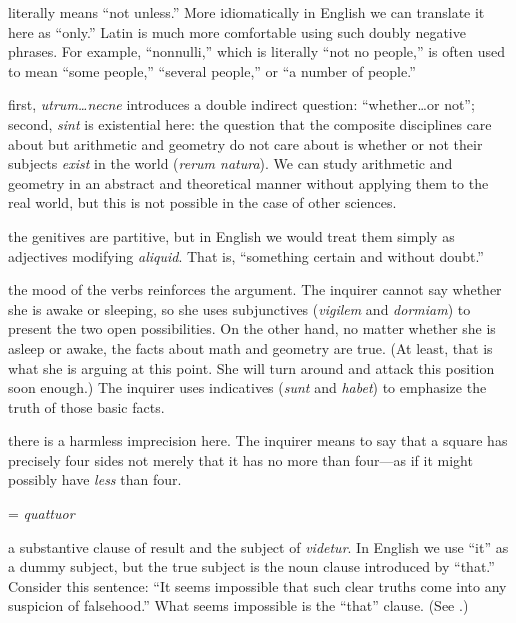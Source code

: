  literally means ``not unless.'' More idiomatically in English we can translate it here as ``only.'' Latin is much more comfortable using such doubly negative phrases. For example, ``nonnulli,'' which is literally ``not no people,'' is often used to mean ``some people,'' ``several people,'' or ``a number of people.''

 first, \textit{utrum\dots necne} introduces a double indirect question: ``whether\dots or not''; second, \textit{sint} is existential here: the question that the composite disciplines care about but arithmetic and geometry do not care about is whether or not their subjects \textit{exist} in the world (\textit{rerum natura}). We can study arithmetic and geometry in an abstract and theoretical manner without applying them to the real world, but this is not possible in the case of other sciences.

 the genitives are partitive, but in English we would treat them simply as adjectives modifying \textit{aliquid}. That is, ``something certain and without doubt.''

 the mood of the verbs reinforces the argument. The inquirer cannot say whether she is awake or sleeping, so she uses subjunctives (\textit{vigilem} and \textit{dormiam}) to present the two open possibilities. On the other hand, no matter whether she is asleep or awake, the facts about math and geometry are true. (At least, that is what she is arguing at this point. She will turn around and attack this position soon enough.) The inquirer uses indicatives (\textit{sunt} and \textit{habet}) to emphasize the truth of those basic facts.

 there is a harmless imprecision here. The inquirer means to say that a square has precisely four sides not merely that it has no more than four---as if it might possibly have \textit{less} than four.

 = \textit{quattuor}

 a substantive clause of result and the subject of \textit{videtur}. In English we use ``it'' as a dummy subject, but the true subject is the noun clause introduced by ``that.'' Consider this sentence: ``It seems impossible that such clear truths come into any suspicion of falsehood.'' What seems impossible is the ``that'' clause. (See \cite[218]{huddleston2005}.)

